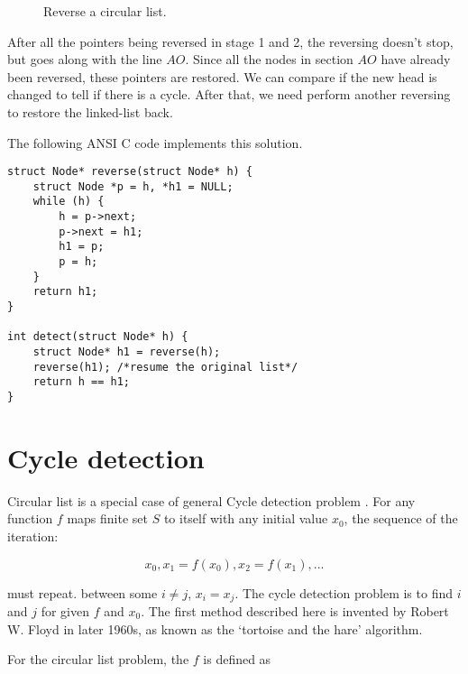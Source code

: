 \documentclass{article}
\begin{document}
\begin{figure}[htdp]
{
}
\caption{Reverse a circular list.}
\label{fig:reverse}
\end{figure}

After all the pointers being reversed in stage 1 and 2, the reversing doesn't
stop, but goes along with the line $AO$. Since all the nodes in section $AO$
have already been reversed, these pointers are restored. We can compare if
the new head is changed to tell if there is a cycle. After that, we need
perform another reversing to restore the linked-list back.

The following ANSI C code implements this solution.

\lstset{language=C}
\begin{lstlisting}
struct Node* reverse(struct Node* h) {
    struct Node *p = h, *h1 = NULL;
    while (h) {
        h = p->next;
        p->next = h1;
        h1 = p;
        p = h;
    }
    return h1;
}

int detect(struct Node* h) {
    struct Node* h1 = reverse(h);
    reverse(h1); /*resume the original list*/
    return h == h1;
}
\end{lstlisting}


\section{Cycle detection}
Circular list is a special case of general Cycle detection problem \cite{wiki-cycle-detection}.
For any function $f$ maps finite set $S$ to itself with any initial value $x_0$, the sequence of the
iteration:

\[
x_0, x_1 = f(x_0), x_2 = f(x_1), ...
\]

must repeat. between some $i \neq j$, $x_i = x_j$. The cycle detection problem is to find $i$ and $j$ for
given $f$ and $x_0$. The first method described here is invented by Robert W. Floyd in later 1960s, as known
as the `tortoise and the hare' algorithm.

For the circular list problem, the $f$ is defined as
\end{document}
